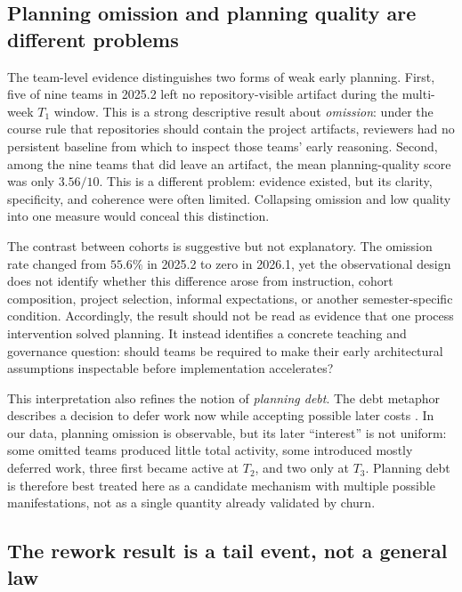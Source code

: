 \documentclass[conference]{IEEEtran}
\begin{document}
\subsection{Planning omission and planning quality are different problems}

The team-level evidence distinguishes two forms of weak early planning.
First, five of nine teams in 2025.2 left no repository-visible artifact during
the multi-week $T_1$ window. This is a strong descriptive result about
\emph{omission}: under the course rule that repositories should contain the
project artifacts, reviewers had no persistent baseline from which to inspect
those teams' early reasoning. Second, among the nine teams that did leave an
artifact, the mean planning-quality score was only $3.56/10$. This is a
different problem: evidence existed, but its clarity, specificity, and
coherence were often limited. Collapsing omission and low quality into one
measure would conceal this distinction.

The contrast between cohorts is suggestive but not explanatory. The omission
rate changed from $55.6\%$ in 2025.2 to zero in 2026.1, yet the observational
design does not identify whether this difference arose from instruction,
cohort composition, project selection, informal expectations, or another
semester-specific condition. Accordingly, the result should not be read as
evidence that one process intervention solved planning. It instead identifies
a concrete teaching and governance question: should teams be required to make
their early architectural assumptions inspectable before implementation
accelerates?

This interpretation also refines the notion of \emph{planning debt}. The debt
metaphor describes a decision to defer work now while accepting possible later
costs \cite{cunningham_1992_technical_debt,kruchten2012technicaldebt}. In our
data, planning omission is observable, but its later ``interest'' is not
uniform: some omitted teams produced little total activity, some introduced
mostly deferred work, three first became active at $T_2$, and two only at
$T_3$. Planning debt
is therefore best treated here as a candidate mechanism with multiple possible
manifestations, not as a single quantity already validated by churn.

\subsection{The rework result is a tail event, not a general law}
\end{document}
